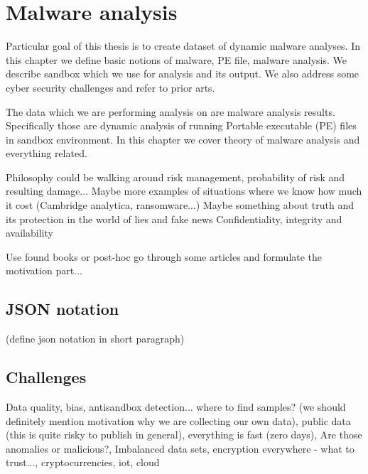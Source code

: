 


\chapter{Malware analysis} \label{chap:analysis}
Particular goal of this thesis is to create dataset of dynamic malware analyses. In this chapter we define basic notions of malware, PE file, malware analysis. We describe sandbox which we use for analysis and its output. We also address some cyber security challenges and refer to prior arts.


The data which we are performing analysis on are malware analysis results. Specifically those are dynamic analysis of running Portable executable (PE) files in sandbox environment. In this chapter we cover theory of malware analysis and everything related. 


Philosophy could be walking around risk management, probability of risk and resulting damage... Maybe more examples of situations where we know how much it cost (Cambridge analytica, ransomware...)
Maybe something about truth and its protection in the world of lies and fake news
Confidentiality, integrity and availability

Use found books or post-hoc go through some articles and formulate the motivation part...

\section{JSON notation} \label{sec:json_notation}
(define json notation in short paragraph)

\section{Challenges}
Data quality, bias, antisandbox detection... where to find samples? (we should definitely mention motivation why we are collecting our own data), public data (this is quite risky to publish in general), everything is fast (zero days), Are those anomalies or malicious?, Imbalanced data sets, encryption everywhere - what to trust..., cryptocurrencies, iot, cloud

